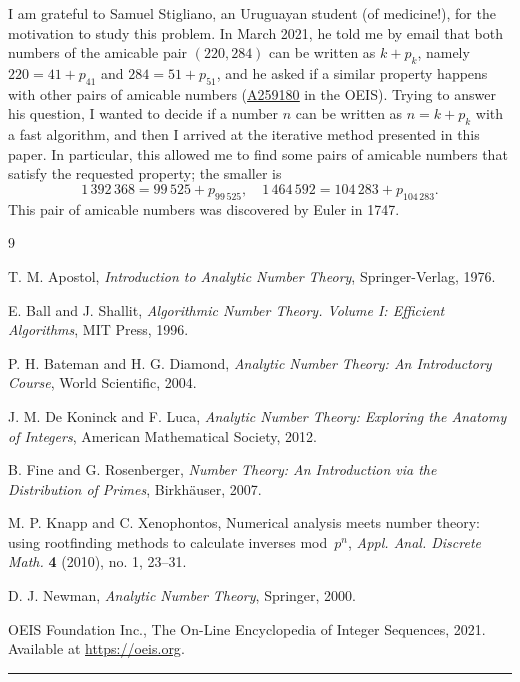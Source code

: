 \documentclass[12pt,reqno]{article}
\newcommand{\seqnum}[1]{\href{https://oeis.org/#1}{\rm \underline{#1}}}
\begin{document}
I am grateful to Samuel Stigliano, an Uruguayan student (of medicine!), 
for the motivation to study this problem. 
In March 2021, he told me by email that both numbers of the amicable pair
$(220, 284)$ can be written as $k + p_k$, 
namely $220 = 41 + p_{41}$ and $284 = 51 + p_{51}$, and he asked if
a similar property happens with other pairs of amicable numbers
(\seqnum{A259180} in the OEIS).
Trying to answer his question, I wanted to decide if a number
$n$ can be written as $n = k + p_{k}$ with a fast algorithm,
and then I arrived at the iterative method presented in this paper.
In particular, this allowed me to find some pairs of amicable numbers 
that satisfy the requested property; the smaller is 
\[
1\,392\,368 = 99\,525 + p_{99\,525},
\quad
1\,464\,592 = 104\,283 + p_{104\,283}.
\]
This pair of amicable numbers was discovered by Euler in 1747.

\begin{thebibliography}{9}

{T. M. Apostol},
\emph{Introduction to Analytic Number Theory},
Springer-Verlag, 1976.

{E. Ball and J. Shallit},
\emph{Algorithmic Number Theory. Volume I: Efficient Algorithms}, 
MIT Press, 1996.

{P. H. Bateman and H. G. Diamond},
\emph{Analytic Number Theory: An Introductory Course},
World Scientific, 2004.

{J. M. De Koninck and F. Luca},
\emph{Analytic Number Theory: Exploring the Anatomy of Integers},
American Mathematical Society, 2012.

{B. Fine and G. Rosenberger},
\emph{Number Theory: An Introduction via the Distribution of Primes},
Birkh\"auser, 2007.

{M. P. Knapp and C. Xenophontos},
{Numerical analysis meets number theory: using rootfinding methods to calculate inverses mod~$p^n$},
\emph{Appl. Anal. Discrete Math.}
\textbf{4} (2010), no. 1, 23--31. 

{D. J. Newman},
\emph{Analytic Number Theory},  
Springer, 2000.

{OEIS Foundation Inc.},
{The On-Line Encyclopedia of Integer Sequences}, 2021.
Available at \url{https://oeis.org}. 

\end{thebibliography}

\bigskip
\hrule
\bigskip
\end{document}
